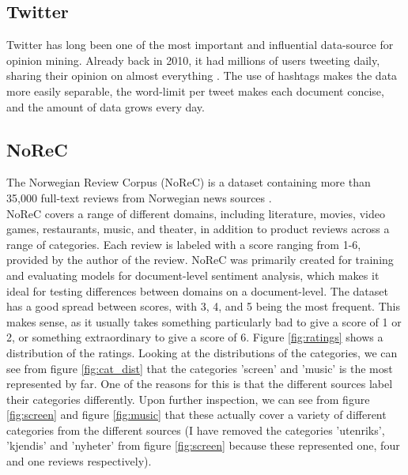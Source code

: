 \documentclass{report}
\begin{document}
\subsection{Twitter}
Twitter has long been one of the most important and influential data-source for opinion mining. Already back in 2010, it had millions of users tweeting daily, sharing their opinion on almost everything \cite{pak-paroubek-2010-twitter}. The use of hashtags makes the data more easily separable, the word-limit per tweet makes each document concise, and the amount of data grows every day.


\subsection{NoReC}
The Norwegian Review Corpus (NoReC) is a dataset containing more than 35,000 full-text reviews from Norwegian news sources \cite{VelOvrBer18}.\\
NoReC covers a range of different domains, including literature, movies, video games, restaurants, music, and theater, in addition to product reviews across a range of categories. Each review is labeled with a score ranging from 1-6, provided by the author of the review. NoReC was primarily created for training and evaluating models for document-level sentiment analysis, which makes it ideal for testing differences between domains on a document-level. The dataset has a good spread between scores, with 3, 4, and 5 being the most frequent. This makes sense, as it usually takes something particularly bad to give a score of 1 or 2, or something extraordinary to give a score of 6. Figure \ref{fig:ratings} shows a distribution of the ratings. Looking at the distributions of the categories, we can see from figure \ref{fig:cat_dist} that the categories 'screen' and 'music' is the most represented by far. One of the reasons for this is that the different sources label their categories differently. Upon further inspection, we can see from figure \ref{fig:screen} and figure \ref{fig:music} that these actually cover a variety of different categories from the different sources (I have removed the categories 'utenriks', 'kjendis' and 'nyheter' from figure \ref{fig:screen} because these represented one, four and one reviews respectively).
\end{document}
